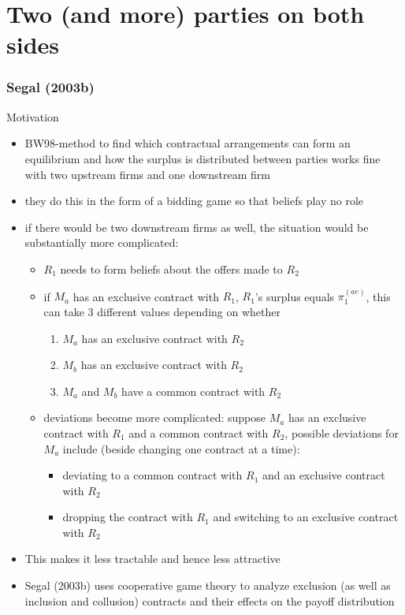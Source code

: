 \documentclass[11pt,english]{beamer}
\begin{document}
\part[lecture 7]{Two (and more) parties on both sides}

\section{Segal (2003b)}


\begin{frame}[allowframebreaks]{Motivation}
  \begin{itemize}
  \item BW98-method to find which contractual arrangements can form
    an equilibrium and how the surplus is distributed between parties
    works fine with two upstream firms and one downstream firm
  \item they do this in the form of a bidding game so that beliefs
    play no role
  \item if there would be two downstream firms as well, the situation
    would be substantially more complicated:
    \begin{itemize}
    \item $R_1$ needs to form beliefs about the offers made to $R_2$
    \item if $M_a$ has an exclusive contract with $R_1$, $R_1$'s
      surplus equals $\pi_1^{(ae)}$, this can take 3 different values
      depending on whether
      \begin{enumerate}
      \item $M_a$ has an exclusive contract with $R_2$
      \item $M_b$ has an exclusive contract with $R_2$
      \item $M_a$ and $M_b$ have a common contract with $R_2$
      \end{enumerate}
    \item deviations become more complicated: suppose $M_a$ has an
      exclusive contract with $R_1$ and a common contract with $R_2$,
      possible deviations for $M_a$ include (beside changing one
      contract at a time):
      \begin{itemize}
      \item deviating to a common contract with $R_1$ and an exclusive
        contract with $R_2$
      \item dropping the contract with $R_1$ and switching to an
        exclusive contract with $R_2$
      \end{itemize}
    \end{itemize}
  \item This makes it less tractable and hence less attractive
  \item Segal (2003b) uses cooperative game theory to analyze
    exclusion (as well as inclusion and collusion) contracts and their
    effects on the payoff distribution
  \end{itemize}
\end{frame}
\end{document}
